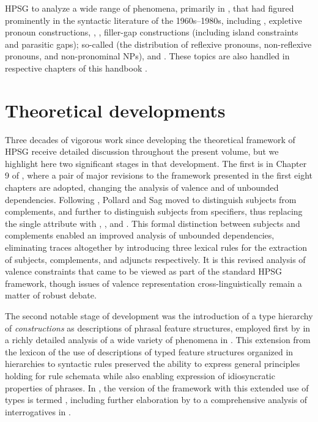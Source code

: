 \documentclass[output=paper,biblatex,babelshorthands,newtxmath,draftmode,colorlinks,citecolor=brown]{langscibook}
\begin{document}
HPSG to analyze a wide range of phenomena, primarily in , that had figured prominently
in the syntactic literature of the 1960s--1980s, including ,
expletive pronoun constructions, , , filler-gap
  constructions (including island constraints and parasitic gaps); so-called
 (the distribution of reflexive pronouns, non-reflexive pronouns, and
non-pronominal NPs), and . These topics are also handled in
respective chapters of this handbook
\parencites{chapters/agreement}{chapters/control-raising}{chapters/udc}{chapters/islands}{chapters/binding}[Section~\ref{sec-scope-in-hpsg}]{chapters/semantics}.

\section{Theoretical developments}
\label{evolution:sec-theoretical-developments}

Three decades of vigorous work since \cite{ps} developing the theoretical framework of HPSG receive detailed discussion throughout the present volume, but we highlight here two significant stages in that development.  The first is in Chapter 9 of , where a pair of major revisions to the framework presented in the first eight chapters are adopted, changing the analysis of valence and of unbounded dependencies.  Following \citet{Borsley87a,Borsley88b-u,Borsley89,Borsley90a}, Pollard and Sag moved to distinguish subjects from complements, and further to distinguish subjects from specifiers, thus replacing the single \subcat attribute with \subj, \spr, and \comps.  This formal distinction between subjects and complements enabled an improved analysis of unbounded dependencies, eliminating traces altogether by introducing three lexical rules for the extraction of subjects, complements, and adjuncts respectively.   It is this revised analysis of valence constraints that came to be viewed as part of the standard HPSG framework, though issues of valence representation cross-linguistically remain a matter of robust debate.

The second notable stage of development was the introduction of a type hierarchy of \emph{constructions} as descriptions of phrasal feature structures, employed first by \citet{Sag97a} in a richly detailed analysis of a wide variety of  phenomena in .  This extension from the lexicon of the use of descriptions of typed feature structures organized in hierarchies to syntactic rules preserved the ability to express general principles holding for rule schemata while also enabling expression of idiosyncratic properties of phrases.  In , the version of the framework with this extended use of types is termed , including further elaboration by \citet{GSag2000a-u} to a comprehensive analysis of interrogatives in .  
\end{document}
